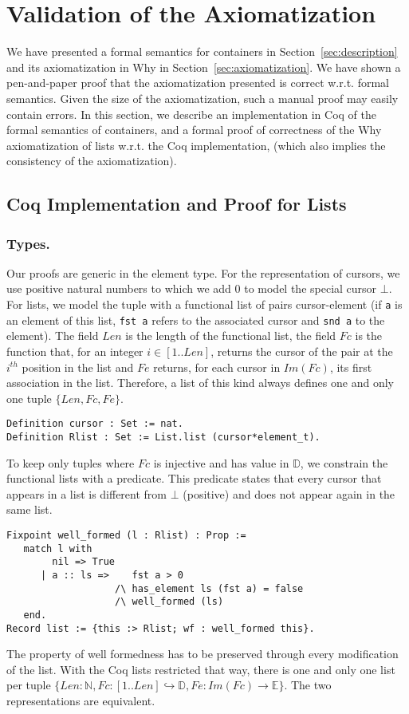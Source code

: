 \documentclass[runningheads,a4paper]{llncs}
\newcommand{\wrt}{w.r.t.\xspace}
\newcommand{\Fc}{\ensuremath{\mathit{Fc}}\xspace}
\newcommand{\Fe}{\ensuremath{\mathit{Fe}}\xspace}
\newcommand{\typL}{\ensuremath{\{\Len,\Fc,\Fe\}}\xspace}
\newcommand{\ImFc}{\ensuremath{\mathit{Im}(\Fc)}\xspace}
\newcommand{\TypE}{\ensuremath{\mathbb{E}}\xspace}
\newcommand{\TypD}{\ensuremath{\mathbb{D}}\xspace}
\newcommand{\Nat}{\ensuremath{\mathbb{N}}\xspace}
\newcommand{\Len}{\ensuremath{\mathit{Len}}\xspace}
\newcommand{\beforesec}{\vspace{-0.2cm}}
\newcommand{\aftersec}{\vspace{-0.2cm}}
\newcommand{\beforesub}{\vspace{-0.2cm}}
\newcommand{\aftersub}{\vspace{-0.1cm}}
\begin{document}
\beforesec
\section{Validation of the Axiomatization}
\label{sec:validation}
\aftersec

We have presented a formal semantics for containers in
Section~\ref{sec:description} and its axiomatization in Why in
Section~\ref{sec:axiomatization}. We have shown a pen-and-paper proof that the
axiomatization presented is correct \wrt formal semantics. Given the size of
the axiomatization, such a manual proof may easily contain errors. In this
section, we describe an implementation in Coq of the formal semantics of
containers, and a formal proof of correctness of the Why axiomatization of
lists \wrt the Coq implementation, (which also implies
the consistency of the axiomatization).

\beforesub
\subsection{Coq Implementation and Proof for Lists}
\aftersub

\subsubsection{Types.}

Our proofs are generic in the element type. For the representation of cursors, we use positive natural
numbers to which we add 0 to model the special cursor $\bot$.
For lists, we model the tuple with a functional list of pairs cursor-element (if \verb|a| is an element of this list, \verb|fst a| refers to the associated cursor
and \verb|snd a| to the element). The field $\Len$ is the length of the
functional list, the field $\Fc$ is the function that, for an integer $i\in[1..\Len]$, returns the cursor of the pair at the $i^{th}$ position
in the list and $\Fe$ returns, for each cursor in $\ImFc$, its first association in the list. Therefore, a list of this kind always defines one and only one
tuple $\typL$.
\begin{verbatim}
Definition cursor : Set := nat.
Definition Rlist : Set := List.list (cursor*element_t).
\end{verbatim}
To keep only tuples where $\Fc$ is injective and has value in $\TypD$, we constrain the functional lists with a predicate.
This predicate states that every cursor that appears in a list is different from $\bot$ (positive) and does not appear again in the same list. 
\begin{verbatim}
Fixpoint well_formed (l : Rlist) : Prop :=
   match l with
        nil => True
      | a :: ls =>    fst a > 0
                   /\ has_element ls (fst a) = false
                   /\ well_formed (ls)
   end.
Record list := {this :> Rlist; wf : well_formed this}.
\end{verbatim}
The property of well formedness has to be preserved through every modification of the list. With the Coq lists restricted that
way, there is one and only one list per tuple $\{\Len: \Nat, \Fc : [1 .. \Len] \hookrightarrow \TypD, \Fe : \ImFc
\rightarrow \TypE\}$. The two representations are equivalent.
\end{document}

